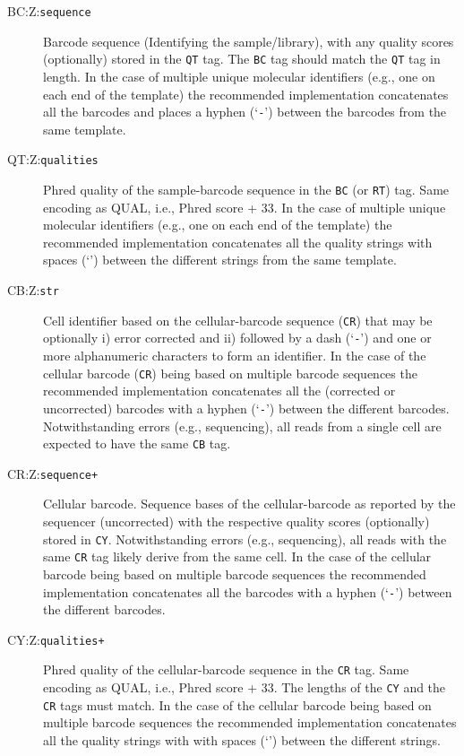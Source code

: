 \documentclass[10pt]{article}
\newcommand{\tagvalue}[1]{\tt #1}
\begin{document}
\begin{description}
\item[BC:Z:\tagvalue{sequence}]
Barcode sequence (Identifying the sample/library), with any quality scores (optionally) stored in the {\tt QT} tag.
The {\tt BC} tag should match the {\tt QT} tag in length. 
In the case of multiple unique molecular identifiers (e.g., one on each end of the template) the recommended implementation concatenates all the barcodes and places a hyphen (`{\tt -}') between the barcodes from the same template. 

\item[QT:Z:\tagvalue{qualities}]
Phred quality of the sample-barcode sequence in the {\tt BC} (or {\tt RT}) tag. 
Same encoding as {\sf QUAL}, i.e., Phred score + 33.
In the case of multiple unique molecular identifiers (e.g., one on each end of the template) the recommended implementation concatenates all the quality strings with spaces (`{\tt \textvisiblespace}') between the different strings from the same template.

\item[CB:Z:\tagvalue{str}]
Cell identifier based on the cellular-barcode sequence ({\tt CR}) that may be optionally i) error corrected and ii) followed by a dash (`{\tt -}') and one or more alphanumeric characters to form an identifier. 
In the case of the cellular barcode ({\tt CR}) being based on multiple barcode sequences the recommended implementation concatenates all the (corrected or uncorrected) barcodes with a hyphen (`{\tt -}') between the different barcodes. 
Notwithstanding errors (e.g., sequencing), all reads from a single cell are expected to have the same {\tt CB} tag.

\item[CR:Z:\tagvalue{sequence+}]
Cellular barcode. Sequence bases of the cellular-barcode as reported by the sequencer (uncorrected) with the respective quality scores (optionally) stored in {\tt CY}. 
Notwithstanding errors (e.g., sequencing), all reads with the same {\tt CR} tag likely derive from the same cell. 
In the case of the cellular barcode being based on multiple barcode sequences the recommended implementation concatenates all the barcodes with a hyphen (`{\tt -}') between the different barcodes.

\item[CY:Z:\tagvalue{qualities+}]
Phred quality of the cellular-barcode sequence in the {\tt CR} tag. 
Same encoding as {\sf QUAL}, i.e., Phred score + 33.
The lengths of the {\tt CY} and the {\tt CR} tags must match. 
In the case of the cellular barcode being based on multiple barcode sequences the recommended implementation concatenates all the quality strings with with spaces (`{\tt \textvisiblespace}') between the different strings.


\end{description}
\end{document}
